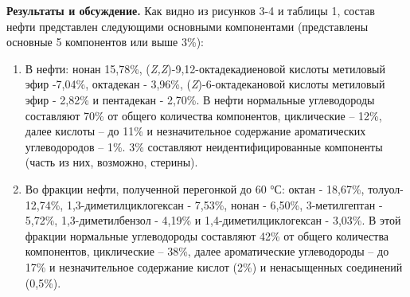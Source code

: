% 
% 

{\bfseries Результаты и обсуждение.} Как видно из рисунков 3-4 и таблицы 1,
состав нефти представлен следующими основными компонентами (представлены
основные 5 компонентов или выше 3\%):

\begin{enumerate}
\def\labelenumi{\arabic{enumi}.}
\item
  В нефти: нонан 15,78\%, (\emph{Z,Z})-9,12-октадекадиеновой кислоты
  метиловый эфир -7,04\%, октадекан - 3,96\%, (\emph{Z})-6-октадекановой
  кислоты метиловый эфир - 2,82\% и пентадекан - 2,70\%. В нефти
  нормальные углеводороды составляют 70\% от общего количества
  компонентов, циклические -- 12\%, далее кислоты -- до 11\% и
  незначительное содержание ароматических углеводородов -- 1\%. 3\%
  составляют неидентифицированные компоненты (часть из них, возможно,
  стерины).
\item
  Во фракции нефти, полученной перегонкой до 60 °С: октан - 18,67\%,
  толуол- 12,74\%, 1,3-диметилциклогексан - 7,53\%, нонан - 6,50\%,
  3-метилгептан - 5,72\%, 1,3-диметилбензол - 4,19\% и
  1,4-диметилциклогексан - 3,03\%. В этой фракции нормальные
  углеводороды составляют 42\% от общего количества компонентов,
  циклические -- 38\%, далее ароматические углеводороды -- до 17\% и
  незначительное содержание кислот (2\%) и ненасыщенных соединений
  (0,5\%).
\end{enumerate}

